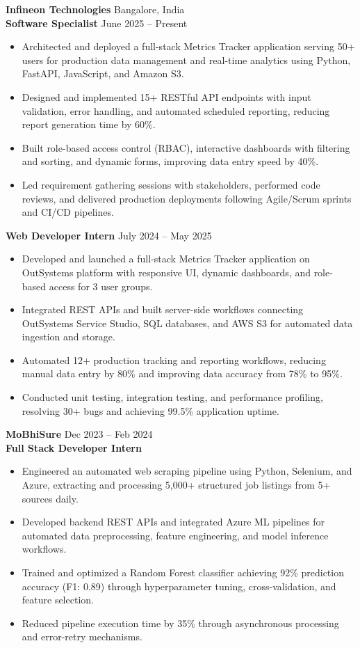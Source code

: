\documentclass[10pt,a4paper]{article}
\begin{document}
\textbf{Infineon Technologies} \hfill Bangalore, India\\
\textbf{Software Specialist} \hfill June 2025 -- Present
\begin{itemize}
\item Architected and deployed a full-stack Metrics Tracker application serving 50+ users for production data management and real-time analytics using Python, FastAPI, JavaScript, and Amazon S3.
\item Designed and implemented 15+ RESTful API endpoints with input validation, error handling, and automated scheduled reporting, reducing report generation time by 60\%.
\item Built role-based access control (RBAC), interactive dashboards with filtering and sorting, and dynamic forms, improving data entry speed by 40\%.
\item Led requirement gathering sessions with stakeholders, performed code reviews, and delivered production deployments following Agile/Scrum sprints and CI/CD pipelines.
\end{itemize}

\textbf{Web Developer Intern} \hfill July 2024 -- May 2025
\begin{itemize}
\item Developed and launched a full-stack Metrics Tracker application on OutSystems platform with responsive UI, dynamic dashboards, and role-based access for 3 user groups.
\item Integrated REST APIs and built server-side workflows connecting OutSystems Service Studio, SQL databases, and AWS S3 for automated data ingestion and storage.
\item Automated 12+ production tracking and reporting workflows, reducing manual data entry by 80\% and improving data accuracy from 78\% to 95\%.
\item Conducted unit testing, integration testing, and performance profiling, resolving 30+ bugs and achieving 99.5\% application uptime.
\end{itemize}

\textbf{MoBhiSure} \hfill Dec 2023 -- Feb 2024\\
\textbf{Full Stack Developer Intern}
\begin{itemize}
\item Engineered an automated web scraping pipeline using Python, Selenium, and Azure, extracting and processing 5,000+ structured job listings from 5+ sources daily.
\item Developed backend REST APIs and integrated Azure ML pipelines for automated data preprocessing, feature engineering, and model inference workflows.
\item Trained and optimized a Random Forest classifier achieving 92\% prediction accuracy (F1: 0.89) through hyperparameter tuning, cross-validation, and feature selection.
\item Reduced pipeline execution time by 35\% through asynchronous processing and error-retry mechanisms.
\end{itemize}
\end{document}

